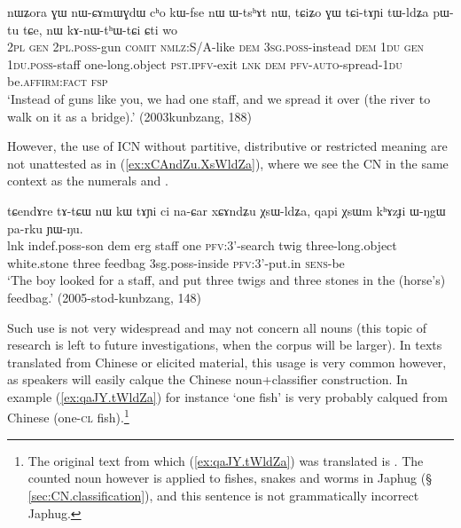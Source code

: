 \begin{exe}
\ex \label{ex:tAYi.tWldZa}
\gll nɯʑora ɣɯ nɯ-ɕɤmɯɣdɯ cʰo kɯ-fse nɯ ɯ-tsʰɤt nɯ, tɕiʑo ɣɯ tɕi-tɤɲi tɯ-ldʑa pɯ-tu tɕe, nɯ kɤ-nɯ-tʰɯ-tɕi ɕti wo \\
\textsc{2pl} \textsc{gen} \textsc{2pl}.\textsc{poss}-gun \textsc{comit} \textsc{nmlz}:S/A-like \textsc{dem} \textsc{3sg}.\textsc{poss}-instead \textsc{dem}  \textsc{1du} \textsc{gen} \textsc{1du}.\textsc{poss}-staff one-long.object \textsc{pst}.\textsc{ipfv}-exit \textsc{lnk} \textsc{dem} \textsc{pfv}-\textsc{auto}-spread-\textsc{1du} be.\textsc{affirm}:\textsc{fact} \textsc{fsp} \\
\glt `Instead of guns like you, we had one staff, and we spread it over (the river to walk on it as a bridge).' (2003kunbzang, 188)
\end{exe} 

However, the use of ICN without partitive, distributive or restricted meaning are not unattested as in (\ref{ex:xCAndZu.XsWldZa}), where we see the CN  in the same context as the numerals  and .

\begin{exe}
\ex \label{ex:xCAndZu.XsWldZa}
\gll tɕendɤre tɤ-tɕɯ nɯ kɯ tɤɲi ci na-ɕar xɕɤndʑu χsɯ-ldʑa, qapi χsɯm kʰɤzɟi ɯ-ŋgɯ pa-rku ɲɯ-ŋu. \\
lnk indef.poss-son dem erg staff one \textsc{pfv}:3'-search twig three-long.object white.stone three feedbag 3sg.poss-inside \textsc{pfv}:3'-put.in \textsc{sens}-be \\
\glt `The boy looked for a staff, and put three twigs and three stones in the (horse's) feedbag.' (2005-stod-kunbzang, 148)
\end{exe} 

Such use is not very widespread and may not concern all nouns (this topic of research is left to future investigations, when the corpus will be larger). In texts translated from Chinese or elicited material, this usage is very common however, as speakers will easily calque the Chinese noun+classifier construction. In example (\ref{ex:qaJY.tWldZa}) for instance  `one fish' is very probably calqued from Chinese   (one-\textsc{cl} fish).\footnote{The original text from which (\ref{ex:qaJY.tWldZa}) was translated is . The counted noun  however is applied to fishes, snakes and worms in Japhug (§ \ref{sec:CN.classification}), and this sentence is not grammatically incorrect Japhug. } 

